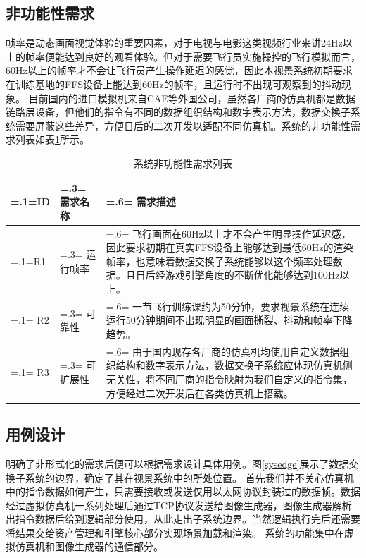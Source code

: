 \subsection{非功能性需求}
帧率是动态画面视觉体验的重要因素，对于电视与电影这类视频行业来讲24Hz以上的帧率便能达到良好的观看体验\cite{frame}。但对于需要飞行员实施操控的飞行模拟而言，60Hz以上的帧率才不会让飞行员产生操作延迟的感觉，因此本视景系统初期要求在训练基地的FFS设备上能达到60Hz的帧率，且运行时不出现可观察到的抖动现象。
目前国内的进口模拟机来自CAE等外国公司，虽然各厂商的仿真机都是数据链路层设备，但他们的指令有不同的数据组织结构和数字表示方法，数据交换子系统需要屏蔽这些差异，方便日后的二次开发以适配不同仿真机。系统的非功能性需求列表如表\ref{unfuncreq}所示。
\begin{table}[h!]
    \begin{center}
        \caption{系统非功能性需求列表}
        \label{unfuncreq}
        \renewcommand\arraystretch{1.5}
        \begin{tabularx}{\textwidth}{ 
            | >{\centering\arraybackslash\hsize=.1\hsize\linewidth=\hsize}X 
            | >{\centering\arraybackslash\hsize=.3\hsize\linewidth=\hsize}X 
            | >{\raggedright\arraybackslash\hsize=.6\hsize\linewidth=\hsize}X 
            | }
            \hline
            \textbf{ID} & \textbf{需求名称} & \textbf{需求描述}\\
            \hline
            R1 & 运行帧率 & 飞行画面在60Hz以上才不会产生明显操作延迟感，因此要求初期在真实FFS设备上能够达到最低60Hz的渲染帧率，也意味着数据交换子系统能够以这个频率处理数据。且日后经游戏引擎角度的不断优化能够达到100Hz以上。\\
            \hline
            R2 & 可靠性 & 一节飞行训练课约为50分钟，要求视景系统在连续运行50分钟期间不出现明显的画面撕裂、抖动和帧率下降趋势。\\
            \hline
            R3 & 可扩展性 & 由于国内现存各厂商的仿真机均使用自定义数据组织结构和数字表示方法，数据交换子系统应体现仿真机侧无关性，将不同厂商的指令映射为我们自定义的指令集，方便经过二次开发后在各类仿真机上搭载。\\
            \hline
        \end{tabularx}
    \end{center}
\end{table}

\subsection{用例设计}
明确了非形式化的需求后便可以根据需求设计具体用例。图\ref{sysedge}展示了数据交换子系统的边界，确定了其在视景系统中的所处位置。
首先我们并不关心仿真机中的指令数据如何产生，只需要接收或发送仅用以太网协议封装过的数据帧。数据经过虚拟仿真机一系列处理后通过TCP协议发送给图像生成器，图像生成器解析出指令数据后给到逻辑部分使用，从此走出子系统边界。当然逻辑执行完后还需要将结果交给资产管理和引擎核心部分实现场景加载和渲染。
系统的功能集中在虚拟仿真机和图像生成器的通信部分。

